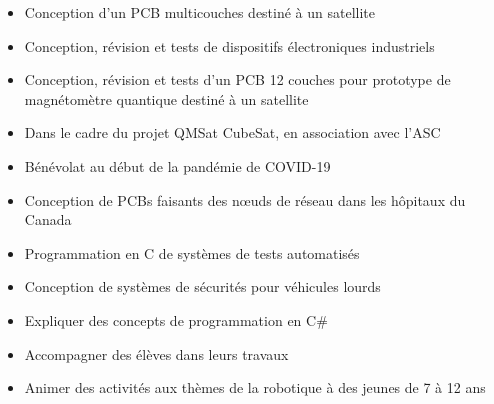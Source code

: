 \documentclass[10pt,a4paper,withhyper]{altacv}
\begin{document}
\begin{paracol}{2}
\divider
{}
\begin{itemize}
\item Conception d'un PCB multicouches destiné à un satellite
\item Conception, révision et tests de dispositifs électroniques industriels
\end{itemize}

\newpage
{}
\begin{itemize}
\item Conception, révision et tests d'un PCB 12 couches pour prototype de magnétomètre quantique destiné à un satellite
\item Dans le cadre du projet QMSat CubeSat, en association avec l'ASC
\end{itemize}

\divider
{}
\begin{itemize}
\item Bénévolat au début de la pandémie de COVID-19
\item Conception de PCBs faisants des nœuds de réseau dans les hôpitaux du Canada
\end{itemize}

\divider
{}
\begin{itemize}
\item Programmation en C de systèmes de tests automatisés
\item Conception de systèmes de sécurités pour véhicules lourds
\end{itemize}

\divider
{}
\begin{itemize}
\item Expliquer des concepts de programmation en C\#
\item Accompagner des élèves dans leurs travaux
\end{itemize}

\divider
{}
\begin{itemize}
\item Animer des activités aux thèmes de la robotique à des jeunes de 7 à 12 ans
\end{itemize}



\end{paracol}
\end{document}
